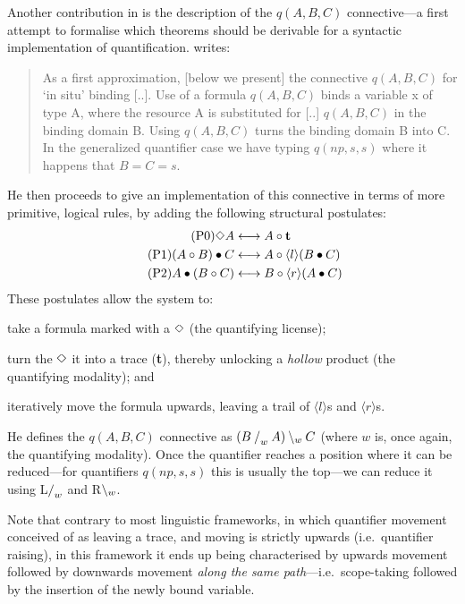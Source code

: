 Another contribution in \citet{moortgat1996} is the description of the
$q(A,B,C)$ connective---a first attempt to formalise which theorems
should be derivable for a syntactic implementation of quantification.
\citeauthor{moortgat1996} writes:
\begin{quote}
  As a first approximation, [below we present] the connective $q(A, B,
  C)$ for `in situ' binding [..]. Use of a formula $q(A,B,C)$ binds a
  variable x of type A, where the resource A is substituted for [..]
  $q(A, B, C)$ in the binding domain B. Using $q(A,B,C)$ turns the
  binding domain B into C. In the generalized quantifier case we have
  typing $q(np, s, s)$ where it happens that $B = C = s$.
\end{quote}
\begin{pfblock}
\end{pfblock}
He then proceeds to give an implementation of this connective in terms
of more primitive, logical rules, by adding the following structural
postulates:
\begin{align}
  \tag{P0}
  \Diamond A
  &\longleftrightarrow
  A\mathbin{\circ}\mathbf{t}
  \label{eqn:mmp0}
  \\
  \tag{P1}
  (A\mathbin{\circ} B)\bullet C
  &\longleftrightarrow
  A\mathbin{\circ}\langle l\rangle(B\bullet C)
  \label{eqn:mmp1}
  \\
  \tag{P2}
  A\bullet(B\mathbin{\circ} C)
  &\longleftrightarrow
  B\mathbin{\circ}\langle r\rangle(A\bullet C)
  \label{eqn:mmp2}
\end{align}
These postulates allow the system to:
\begin{enumerate*}[label=(\arabic*)]
\item take a formula marked with a $\Diamond$ (the quantifying license);
\item turn the $\Diamond$ it into a trace (\textbf{t}), thereby unlocking a
  \emph{hollow} product (the quantifying modality); and
\item iteratively move the formula upwards, leaving a trail of
  $\langle l\rangle$s and $\langle r\rangle$s.
\end{enumerate*}
He defines the $q(A,B,C)$ connective as $(B\mathbin{\slash}_w A)\mathbin{\backslash}_w C$ (where
$w$ is, once again, the quantifying modality). Once the quantifier
reaches a position where it can be reduced---for quantifiers
$q(np,s,s)$ this is usually the top---we can reduce it using
L$\mathbin{\slash}_w$ and R$\mathbin{\backslash}_w$.

Note that contrary to most linguistic frameworks, in which quantifier
movement conceived of as leaving a trace, and moving is strictly
upwards (i.e.\ quantifier raising), in this framework it ends up being
characterised by upwards movement followed by downwards movement
\emph{along the same path}---i.e.\ scope-taking followed by the
insertion of the newly bound variable.

